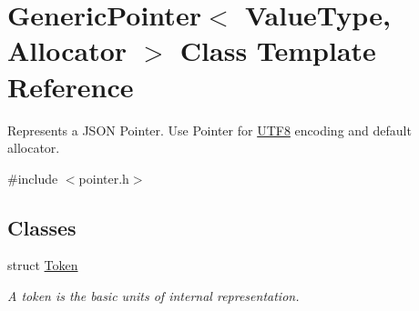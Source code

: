 \hypertarget{class_generic_pointer}{}\section{Generic\+Pointer$<$ Value\+Type, Allocator $>$ Class Template Reference}
\label{class_generic_pointer}


Represents a J\+S\+ON Pointer. Use Pointer for \hyperlink{struct_u_t_f8}{U\+T\+F8} encoding and default allocator.  




{\ttfamily \#include $<$pointer.\+h$>$}

\subsection*{Classes}
\begin{DoxyCompactItemize}
\item 
struct \hyperlink{struct_generic_pointer_1_1_token}{Token}
\begin{DoxyCompactList}\small\item\em A token is the basic units of internal representation. \end{DoxyCompactList}\end{DoxyCompactItemize}
